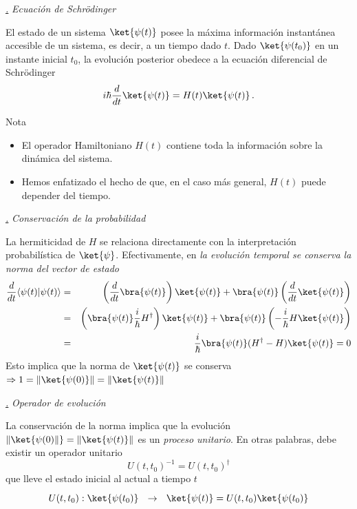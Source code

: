 \documentclass[a4paper,11pt]{book} %
\numberwithin{equation}{chapter}
\newcommand{\braket}[2]{\langle #1|#2\rangle}
\def\subsubiContadorIt{\par\addtocounter{subsubsection}{1}\underline{\it\thesubsubsection.}\hskip0.5cm \setcounter{subsubsubsectionIt}{0}}
\newcommand{\SubsubiIt}[1]{
		\subsubiContadorIt \textit{#1}
	}
\newcounter{subsubsubsectionIt}[subsubsection]
\begin{document}
		\SubsubiIt{Ecuación de Schrödinger}

El estado de un sistema $\ket{\psi(t)}$ posee la máxima información instantánea accesible de un sistema, es decir, a un tiempo dado $t$. Dado $\ket{\psi(t_0)}$ en un instante inicial $t_0$, la evolución posterior obedece a la  ecuación diferencial de Schrödinger
	\begin{equation} \label{ec_fundamentos_ec_de_schrodinger_con_t}
	i \hbar \frac{d}{d t}\ket{\psi(t)} = H(t) \ket{\psi(t)} \, .
	\end{equation}

\begin{mybox_blue}{Nota}
\begin{itemize}
	\item El operador Hamiltoniano $H(t)$  contiene toda la información sobre la dinámica del sistema.
	\item Hemos enfatizado el hecho de que, en el caso más general, $H(t)$ puede depender del tiempo.
\end{itemize}
\end{mybox_blue}

		\SubsubiIt{Conservación de la probabilidad}

La hermiticidad de $H$ se relaciona directamente con la interpretación probabilística de $\ket{\psi}$. Efectivamente, en \textit{la evolución temporal se conserva la norma del vector de estado}
\begin{eqnarray}
\frac{d}{dt}\braket{\psi(t)}{\psi(t)} &=& \left(\rule{0mm}{3mm}\frac{d}{dt}\bra{\psi(t)}\right)\ket{\psi(t)} + 
\bra{\psi(t)}\left(\frac{d}{dt}\ket{\psi(t)} \right)\nonumber\\
&=& \left(\bra{\psi(t)}\frac{i}{\hbar}H^\dagger\right)\ket{\psi(t)} + \bra{\psi(t)}\left(-\frac{i}{\hbar}H\ket{\psi(t)} \right) \\
&=&\frac{i}{\hbar} \bra{\psi(t)}(H^\dagger - H)\ket{\psi(t)} = 0 \nonumber
\end{eqnarray}
Esto implica que la norma de $\ket{\psi(t)}$ se conserva $\Rightarrow 1 = \|\ket{\psi(0)}\| =\|\ket{\psi(t)}\|$


		\SubsubiIt{Operador de evolución}

La conservación de la norma implica que la evolución $\|\ket{\psi(0)\|} =\|\ket{\psi(t)}\|$ es un \textit{proceso unitario}. En otras palabras, debe existir un operador unitario 
	\begin{equation}
	U(t,t_0)^{-1}= U(t,t_0)^\dagger 
	\end{equation}
que lleve el estado inicial al actual a tiempo $t$
	\begin{equation}
	 U(t,t_0): \ket{\psi(t_0)}~~ \to~~ \rule{0mm}{3.5mm} \ket{\psi(t)} = U(t,t_0)\ket{\psi(t_0)}
	\end{equation}
\end{document}

